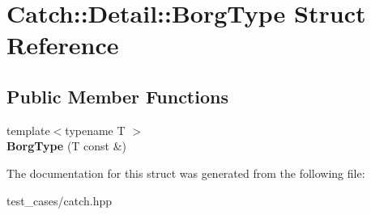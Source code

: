 \hypertarget{structCatch_1_1Detail_1_1BorgType}{}\section{Catch\+:\+:Detail\+:\+:Borg\+Type Struct Reference}
\label{structCatch_1_1Detail_1_1BorgType}
\subsection*{Public Member Functions}
\begin{DoxyCompactItemize}
\item 
\mbox{\label{structCatch_1_1Detail_1_1BorgType_a780a9946ed0d654f0bfc043c8fc505d8}} 
{\footnotesize template$<$typename T $>$ }\\{\bfseries Borg\+Type} (T const \&)
\end{DoxyCompactItemize}


The documentation for this struct was generated from the following file\+:\begin{DoxyCompactItemize}
\item 
test\+\_\+cases/catch.\+hpp\end{DoxyCompactItemize}
